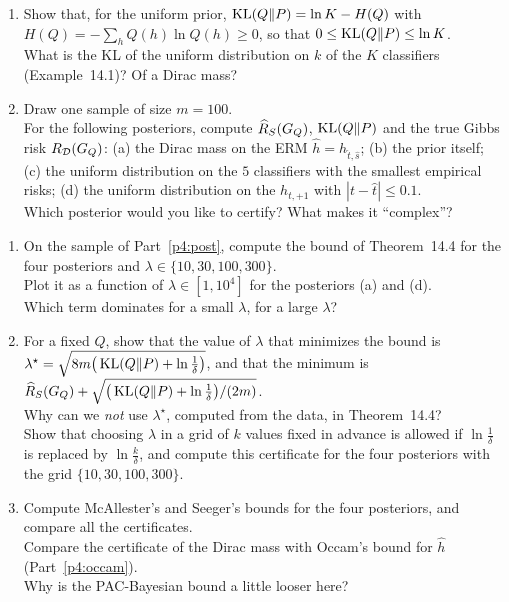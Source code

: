 \documentclass[a4paper,11pt]{article}
\begin{document}
\begin{enumerate}
\item Show that, for the uniform prior, $\operatorname{KL}(Q\|P)=\ln K-H(Q)$ with $H(Q)=-\sum_hQ(h)\ln Q(h)\geq0$, so that
      $0\leq\operatorname{KL}(Q\|P)\leq\ln K$.\\
      What is the KL of the uniform distribution on $k$ of the $K$ classifiers (Example~14.1)? Of a Dirac mass?
\item Draw one sample of size $m=100$.\\
      For the following posteriors, compute $\widehat{R}_{S}(G_{Q})$, $\operatorname{KL}(Q\|P)$ and the true Gibbs risk $R_{\mathcal{D}}(G_{Q})$:
      (a) the Dirac mass on the ERM $\hat h=h_{\hat t,\hat s}$; (b) the prior itself; (c) the uniform distribution on the $5$
      classifiers with the smallest empirical risks; (d) the uniform distribution on the $h_{t,+1}$ with $|t-\hat t|\leq0.1$.\\
      Which posterior would you like to certify? What makes it ``complex''?
\end{enumerate}

\label{p4:bounds}

\begin{enumerate}
\item On the sample of Part~\ref{p4:post}, compute the bound of Theorem~14.4 for the four posteriors and
      $\lambda\in\{10,30,100,300\}$.\\
      Plot it as a function of $\lambda\in[1,10^4]$ for the posteriors (a) and (d).\\
      Which term dominates for a small $\lambda$, for a large $\lambda$?
\item For a fixed $Q$, show that the value of $\lambda$ that minimizes the bound is
      $\lambda^\star=\sqrt{8m\big(\operatorname{KL}(Q\|P)+\ln\frac1\delta\big)}$, and that the minimum is
      $\widehat{R}_{S}(G_{Q})+\sqrt{\big(\operatorname{KL}(Q\|P)+\ln\frac1\delta\big)/(2m)}$.\\
      Why can we \emph{not} use $\lambda^\star$, computed from the data, in Theorem~14.4?\\
      Show that choosing $\lambda$ in a grid of $k$ values fixed in advance is allowed if $\ln\frac1\delta$ is replaced by
      $\ln\frac k\delta$, and compute this certificate for the four posteriors with the grid $\{10,30,100,300\}$.
\item Compute McAllester's and Seeger's bounds for the four posteriors, and compare all the certificates.\\
      Compare the certificate of the Dirac mass with Occam's bound for $\hat h$ (Part~\ref{p4:occam}).\\
      Why is the PAC-Bayesian bound a little looser here?
\end{enumerate}
\end{document}
